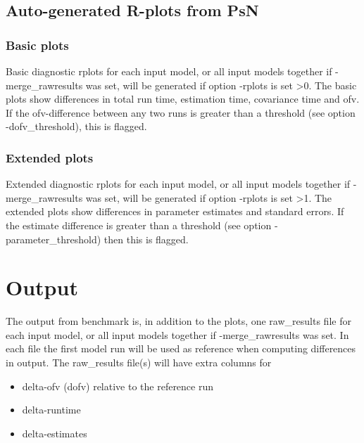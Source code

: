 \subsection{Auto-generated R-plots from PsN}
\newcommand{\rplotsconditions}{The default benchmark template 
requires no special R libraries.
If no pdf is generated,
see the .Rout file in the main run directory for error messages.}


\subsubsection*{Basic plots}
Basic diagnostic rplots for each input model, or all input models together if -merge\_rawresults was set, 
will be generated if option -rplots is set >0.
The basic plots show differences in total run time, estimation time, covariance time and ofv.
If the ofv-difference between any two runs is greater than a threshold (see option -dofv\_threshold), this is flagged. 

\subsubsection*{Extended plots}
Extended diagnostic rplots for each input model, or all input models together if -merge\_rawresults was set, 
will be generated if option -rplots is set >1.
The extended plots show differences in parameter estimates and standard errors.
If the estimate difference is greater than a threshold (see option -parameter\_threshold) then this is flagged.

\section{Output}
The output from benchmark is, in addition to the plots,
one raw\_results file for each input model, or all input models together if -merge\_rawresults was set.
In each file the first model run will be used as reference when computing differences in output.
The raw\_results file(s) will have extra columns for
\begin{itemize}
\item delta-ofv (dofv) relative to the reference run
\item delta-runtime 
\item delta-estimates 
\end{itemize}




